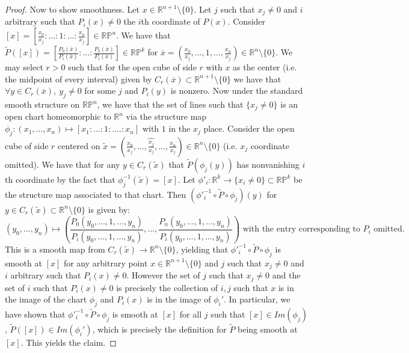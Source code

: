 \documentclass{article}
\newcommand{\bb}[1]{\mathbb{#1}}
\begin{document}
\begin{proof}
Now to show smoothness. Let $x  \in \bb{R}^{n+1}\setminus \{0\}$. Let $j$ such that $x_{j} \neq 0$ and $i$ arbitrary such that $P_{i}(x) \neq 0$ the $i$th coordinate of $P(x)$. Consider $[x] = [\frac{x_{0}}{x_{j}}:...:1:...:\frac{x_{n}}{x_{j}}] \in \bb{RP}^{n}$. We have that $\widetilde{P}([x]) = [\frac{P_{0}(\overline{x})}{P_{i}(\overline{x})}:...:\frac{P_{k}(\overline{x})}{P_{i}(\overline{x})}] \in \bb{RP}^{k}$ for $\overline{x} = (\frac{x_{0}}{x_{j}},...,1,...,\frac{x_{n}}{x_{j}}) \in \bb{R}^{n}\setminus \{0\}$. We may select $r > 0$ such that for the open cube of side $r$ with $x$ as the center (i.e. the midpoint of every interval) given by $C_{r}(\overline{x}) \subset \bb{R}^{n+1} \setminus \{0\}$ we have that $\forall y \in C_{r}(\overline{x}), \ y_{j} \neq 0$ for some $j$ and $P_{i}(y)$ is nonzero. Now under the standard smooth structure on $\bb{RP}^{n}$, we have that the set of lines such that $\{x_{j} \neq 0\}$ is an open chart homeomorphic to $\bb{R}^{n}$ via the structure map $\phi_{j}: (x_{1},...,x_{n}) \mapsto [x_{1}:...:1:....:x_{n}]$ with $1$ in the $x_{j}$ place. Consider the open cube of side $r$ centered on $\widetilde{x} = (\frac{x_{0}}{x_{j}},...,\hat{\frac{x_{j}}{x_{j}}},...,\frac{x_{n}}{x_{j}}) \in \bb{R}^{n}\setminus \{0\}$ (i.e. $x_{j}$ coordinate omitted). We have that for any $y \in C_{r}(\widetilde{x})$ that $\widetilde{P}(\phi_{j}(y))$ has nonvanishing $i$th coordinate by the fact that $\phi_{j}^{-1}(\widetilde{x}) = [x]$. Let $\phi'_{i}:\bb{R}^{k} \to \{x_{i} \neq 0\} \subset \bb{RP}^{k}$ be the structure map associated to that chart. Then $(\phi'^{-1}_{i} \circ \widetilde{P} \circ \phi_{j})(y)$ for $y \in C_{r}(\widetilde{x}) \subset \bb{R}^{n} \setminus \{0\}$ is given by:
\[
 (y_{0},...,y_{n}) \mapsto \left(\frac{P_{0}(y_{0},...,1,...,y_{n})}{P_{i}(y_{0},...,1,...,y_{n})},...,\frac{P_{n}(y_{0},...,1,...,y_{n})}{P_{i}(y_{0},...,1,...,y_{n})} \right) \text{ with the entry corresponding to $P_{i}$ omitted}.
\]
This is a smooth map from $C_{r}(\widetilde{x}) \to \bb{R}^{n} \setminus \{0\}$, yielding that $\phi'^{-1}_{i} \circ \widetilde{P} \circ \phi_{j}$ is smooth at $[x]$ for any arbitrary point $x \in \bb{R}^{n+1} \setminus \{0\}$ and $j$ such that $x_{j} \neq 0$ and $i$ arbitrary such that $P_{i}(x) \neq 0$. However the set of $j$ such that $x_{j} \neq 0$ and the set of $i$ such that $P_{i}(x) \neq 0$ is precisely the collection of $i,j$ such that $x$ is in the image of the chart $\phi_{j}$ and $P_{i}(x)$ is in the image of $\phi_{i}'$. In particular, we have shown that $\phi'^{-1}_{i} \circ \widetilde{P} \circ \phi_{j}$ is smooth at $[x]$ for all $j$ such that $[x] \in Im(\phi_{j})$, $\widetilde{P}([x]) \in Im(\phi_{i}')$, which is precisely the definition for $\widetilde{P}$ being smooth at $[x]$. This yields the claim. 
\end{proof}
\end{document}

